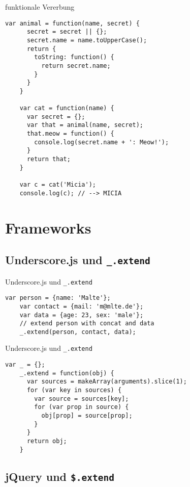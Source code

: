 \begin{frame}[fragile]{funktionale Vererbung}
  \begin{lstlisting}[gobble=4]
    var animal = function(name, secret) {
      secret = secret || {};
      secret.name = name.toUpperCase();
      return {
        toString: function() {
          return secret.name;
        }
      }
    }
    
    var cat = function(name) {
      var secret = {};
      var that = animal(name, secret);
      that.meow = function() {
        console.log(secret.name + ': Meow!');
      }
      return that;
    }
    
    var c = cat('Micia');
    console.log(c); // --> MICIA
  \end{lstlisting}
\end{frame}

\section{Frameworks}

\subsection{Underscore.js und \texttt{\_.extend}}

\begin{frame}[fragile]{Underscore.js und \texttt{\_.extend}}
  \begin{lstlisting}[basicstyle=\ttfamily,gobble=4]
    var person = {name: 'Malte'};
    var contact = {mail: 'm@mlte.de'};
    var data = {age: 23, sex: 'male'};
    // extend person with concat and data
    _.extend(person, contact, data);
  \end{lstlisting}
\end{frame}

\begin{frame}[fragile]{Underscore.js und \texttt{\_.extend}}
  \begin{lstlisting}[basicstyle=\ttfamily,gobble=4]
    var _ = {};
    _.extend = function(obj) {
      var sources = makeArray(arguments).slice(1);
      for (var key in sources) {
        var source = sources[key];
        for (var prop in source) {
          obj[prop] = source[prop];
        }
      }
      return obj;
    }
  \end{lstlisting}
\end{frame}

\subsection{jQuery und \texttt{\$.extend}}

